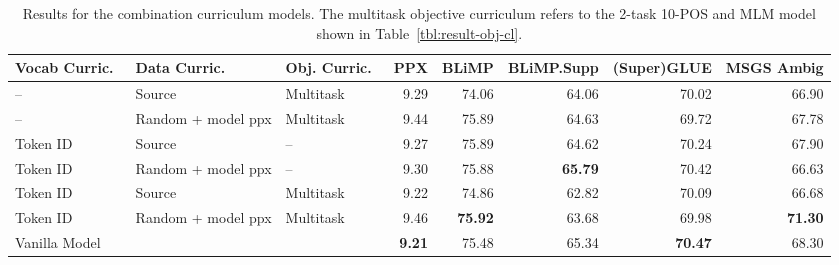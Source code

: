 \begin{table}
\centering
\small
\begin{tabular}{lll|rrrrr}
\toprule
Vocab Curric.\ & Data Curric.\ & Obj. Curric.\ & PPX & BLiMP & BLiMP.Supp & (Super)GLUE & MSGS Ambig  \\
\midrule
-- & Source & Multitask &                           9.29& 74.06 & 64.06 & 70.02 & 66.90 \\
-- & Random + model ppx & Multitask &                9.44& 75.89 & 64.63 & 69.72 & 67.78 \\
Token ID & Source & -- &                     
 9.27& 75.89 & 64.62 & 70.24 & 67.90 \\
Token ID & Random + model ppx & -- &
    9.30& 75.88 & \textbf{65.79} & 70.42 & 66.63 \\
Token ID & Source & Multitask &
     9.22 & 74.86 & 62.82 & 70.09 & 66.68 \\
Token ID & Random + model ppx & Multitask & 9.46& \textbf{75.92} & 63.68 & 69.98 & \textbf{71.30} \\
\midrule
Vanilla Model & & & \textbf{9.21} & 75.48 & 65.34 & \textbf{70.47} & 68.30 \\
\bottomrule
\end{tabular}
\caption{\label{tbl:result-combination-cl} Results for the combination curriculum models. The multitask objective curriculum refers to the 2-task 10-POS and MLM model shown in Table~\ref{tbl:result-obj-cl}. }
\end{table}


